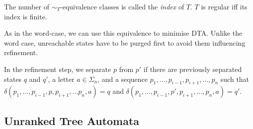 \documentclass[english]{panikzettel}
\begin{document}
The number of ${\sim_T}$-equivalence classes is called the \emph{index} of $T$. $T$ is regular iff its index is finite.

As in the word-case, we can use this equivalence to minimise DTA. Unlike the word case, unreachable states have to be purged first to avoid them influencing refinement.

In the refinement step, we separate $p$ from $p'$ if there are previously separated states $q$ and $q'$, a letter $a \in \Sigma_n$, and a sequence $p_1,\ldots, p_{i-1}, p_{i+1}, \ldots, p_{n}$ such that $\delta(p_1,\ldots, p_{i-1} ,p, p_{i+1}, \ldots p_n, a) = q$ and $\delta(p_1,\ldots, p_{i-1} ,p', p_{i+1}, \ldots, p_n, a) = q'$.

\subsection{Unranked Tree Automata}
\end{document}
